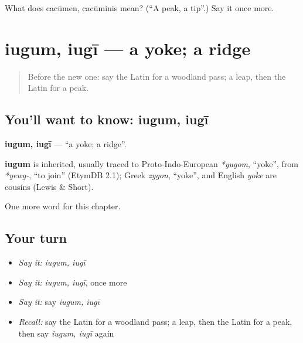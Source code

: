\begin{tcolorbox}[breakable,colback=teal!4,colframe=teal!35!black,title={Before you move on}]
What does cacūmen, cacūminis mean? (\textquotedblleft{}A peak, a tip\textquotedblright{}.) Say it once more.
\end{tcolorbox}
\section[iugum, iugī]{iugum, iugī — a yoke; a ridge}

\label{lesson:LA-C228-iugum}



\begin{quote}
Before the new one: say the Latin for a woodland pass; a leap, then the Latin for a peak.
\end{quote}

\subsection*{You'll want to know: iugum, iugī}
\textbf{iugum, iugī} — \textquotedblleft{}a yoke; a ridge\textquotedblright{}.

\begin{cousinweb}
\textbf{iugum} is inherited, usually traced to Proto-Indo-European \emph{*yugom}, \textquotedblleft{}yoke\textquotedblright{}, from \emph{*yewg-}, \textquotedblleft{}to join\textquotedblright{} (EtymDB 2.1); Greek \emph{zygon}, \textquotedblleft{}yoke\textquotedblright{}, and English \emph{yoke} are cousins (Lewis \& Short).
\end{cousinweb}

\begin{grammarlens}[title={What you've built}]
One more word for this chapter.
\end{grammarlens}

\subsection*{Your turn}
\begin{itemize}
\raggedright
  \item \emph{Say it:} \emph{iugum, iugī}
  \item \emph{Say it:} \emph{iugum, iugī}, once more
  \item \emph{Say it:} say \emph{iugum, iugī}
  \item \emph{Recall:} say the Latin for a woodland pass; a leap, then the Latin for a peak, then say \emph{iugum, iugī} again
\end{itemize}

